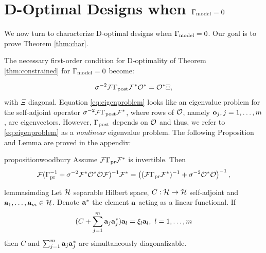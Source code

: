 \section{D-Optimal Designs when $\Gamma_{\textup{model}} = 0$}\label{section:vanishing}
We now turn to characterize D-optimal designs when $\Gamma_{\textup{model}} = 0$. Our
goal is to prove Theorem \ref{thm:char}.

The necessary first-order condition for D-optimality of Theorem
\ref{thm:constrained} for $\Gamma_{\textup{model}} = 0$ become:

\begin{equation}\label{eq:eigenproblem}
  \sigma^{-2}\fwd \postcov \fwd^* \obs^* = \obs^* \Xi,
\end{equation}
with $\Xi$ diagonal. Equation \eqref{eq:eigenproblem} looks like an
eigenvalue problem for the self-adjoint operator $\sigma^{-2}\mathcal{F}
\Gamma_{\textup{post}} \mathcal{F}^*$, where rows of $\mathcal{O}$, namely $\mathbf{o}_j,j=1,\dots, m$,
are eigenvectors. However, $\Gamma_{\textup{post}}$ depends on $\mathcal{O}$ and thus, we
refer to \eqref{eq:eigenproblem} as a \emph{nonlinear} eigenvalue
problem. The following Proposition and Lemma are proved in the
appendix:

\begin{restatable*}{proposition}{woodbury}\label{prop:twice woodbury}
  Assume $\mathcal{F} \Gamma_{\textup{pr}} \mathcal{F}^*$ is invertible. Then
  \begin{align*}
    \begin{split}
      \fwd( \prcov^{-1} + \sigma^{-2}  \fwd^* \obs^* \obs \fwd )^{-1} \fwd^* 
      = \left ( (\fwd\prcov\fwd^*)^{-1} + \sigma^{-2}  \obs^* \obs \right )^{-1},
    \end{split}
  \end{align*}  
\end{restatable*}

\begin{restatable*}{lemma}{simdiag}\label{lemma:sim diag}
  Let $\mathcal{H}$ separable Hilbert space, $C:\mathcal{H} \to \mathcal{H}$ self-adjoint
  and $\mathbf{a}_1,\dots,\mathbf{a}_m \in \mathcal{H}$. Denote $\mathbf{a}^*$ the element
  $\mathbf{a}$ acting as a linear functional. If
  \begin{equation*}
   (C + \sum_{j=1}^m \func_j\func_j^*) \func_l = \xi_l \func_l,\ l = 1,\dots,m
  \end{equation*}
  then $C$ and $\sum_{j=1}^m \mathbf{a}_j \mathbf{a}_j^*$ are simultaneously
  diagonalizable.
\end{restatable*}


